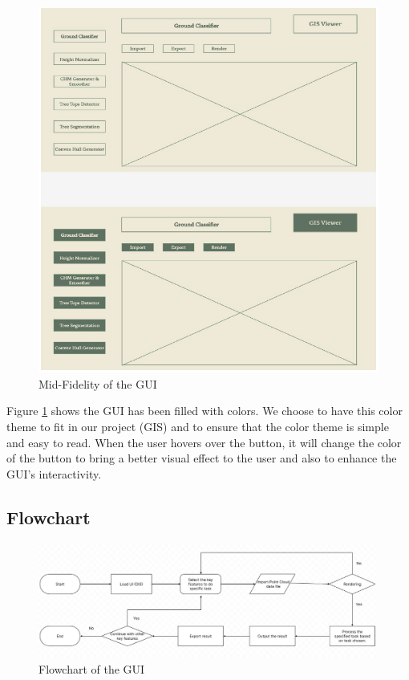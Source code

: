 \documentclass[a4paper, 12pt]{article}
\begin{document}
\begin{figure}[H]
    \centering
    \includegraphics[width=\textwidth]{Images/03.png}
    \caption{Mid-Fidelity of the GUI}
    \label{fig:2}
\end{figure}

Figure \ref{fig:2} shows the GUI has been filled with colors. We choose to have this color theme to fit in our project (GIS) and to ensure that the color theme is simple and easy to read. When the user hovers over the button, it will change the color of the button to bring a better visual effect to the user and also to enhance the GUI’s interactivity.

\subsection{Flowchart}

\begin{figure}[H]
    \centering
    \includegraphics[width=\textwidth]{Images/flow.jpeg}
    \caption{Flowchart of the GUI}
    \label{fig:3}
\end{figure}
\end{document}
